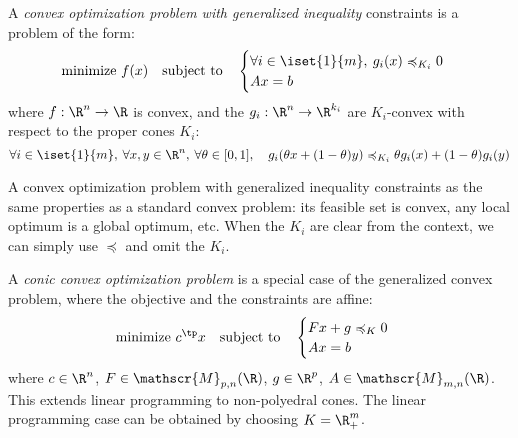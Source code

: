 \begin{definition}
    A \emph{convex optimization problem with generalized inequality} constraints is a problem of the form:
    \begin{equation*}
        \text{minimize } f(x) \quad\text{subject to}\quad \begin{cases}
            \forall i\in\iset{1}{m}, \: g_i(x)\preccurlyeq_{K_i} 0\\
            Ax=b
        \end{cases}
    \end{equation*}
    where $f:\R^n\to\R$ is convex, and the $g_i:\R^n\to\R^{k_i}$ are $K_i$-convex with respect to the proper cones $K_i$:
    \begin{equation*}
        \forall i\in\iset{1}{m}, \: \forall x, y\in\R^n, \: \forall\theta\in[0,1], \quad g_i(\theta x+(1-\theta)y)\preccurlyeq_{K_i} \theta g_i(x)+(1-\theta)g_i(y)
    \end{equation*}
\end{definition}
A convex optimization problem with generalized inequality constraints as the same properties as a standard convex problem: its feasible set is convex, any local optimum is a global optimum, etc. When the $K_i$ are clear from the context, we can simply use $\preccurlyeq$ and omit the $K_i$.

\begin{definition}
    A \emph{conic convex optimization problem} is a special case of the generalized convex problem, where the objective and the constraints are affine:
    \begin{equation*}
        \text{minimize } c^\tp x \quad\text{subject to}\quad \begin{cases}
            Fx+g\preccurlyeq_K 0\\
            Ax=b
        \end{cases}
    \end{equation*}
    where $c\in\R^n$, $F\in\mathscr{M}_{p, n}(\R)$, $g\in\R^p$, $A\in\mathscr{M}_{m, n}(\R)$. This extends linear programming to non-polyedral cones. The linear programming case can be obtained by choosing $K=\R_+^m$.
\end{definition}

